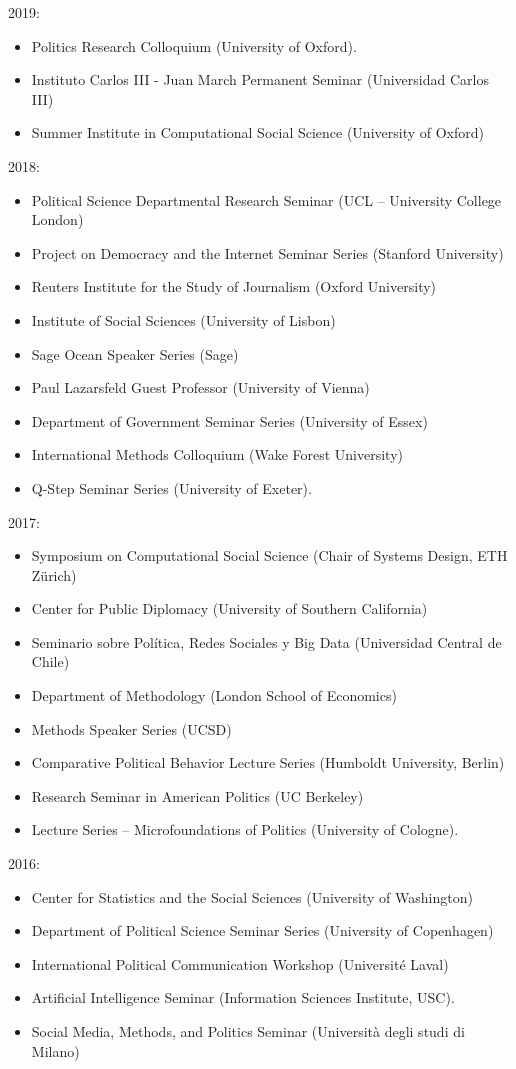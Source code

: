 \documentclass[margin,line,11pt]{resume}
\begin{document}
\begin{resume}
2019: 
\begin{itemize} 
\item Politics Research Colloquium (University of Oxford).
\item Instituto Carlos III - Juan March Permanent Seminar (Universidad Carlos III)
\item Summer Institute in Computational Social Science (University of Oxford)
\end{itemize}
2018: 
\begin{itemize} 
\item Political Science Departmental Research Seminar (UCL -- University College London)
\item Project on Democracy and the Internet Seminar Series (Stanford University)
\item Reuters Institute for the Study of Journalism (Oxford University)
\item Institute of Social Sciences (University of Lisbon)
\item Sage Ocean Speaker Series (Sage)
\item Paul Lazarsfeld Guest Professor (University of Vienna)
\item Department of Government Seminar Series (University of Essex)
\item International Methods Colloquium (Wake Forest University)

\item Q-Step Seminar Series (University of Exeter).
\end{itemize}
2017:    
\begin{itemize}
\item Symposium on Computational Social Science (Chair of Systems Design, ETH Z\"{u}rich)
\item Center for Public Diplomacy (University of Southern California)
\item Seminario sobre Pol\'{i}tica, Redes Sociales y Big Data (Universidad Central de Chile)
\item Department of Methodology (London School of Economics)
\item Methods Speaker Series (UCSD)
\item Comparative Political Behavior Lecture Series (Humboldt University, Berlin)
\item Research Seminar in American Politics (UC Berkeley)
\item Lecture Series -- Microfoundations of Politics (University of Cologne).
\end{itemize}
2016:
\begin{itemize}
\item Center for Statistics and the Social Sciences (University of Washington)
\item Department of Political Science Seminar Series (University of Copenhagen)
\item International Political Communication Workshop (Universit\'{e} Laval)
\item Artificial Intelligence Seminar (Information Sciences Institute, USC).
\item Social Media, Methods, and Politics Seminar (Universit\`{a} degli studi di Milano)
\end{itemize}


\end{resume}
\end{document}

